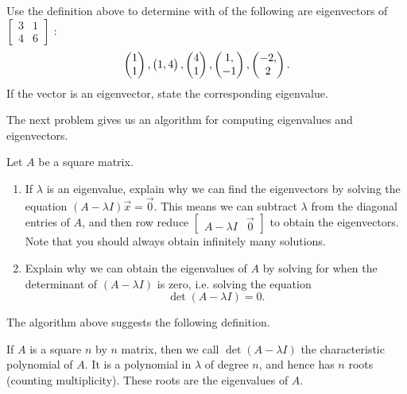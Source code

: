 \begin{problem}\label{use definition of eigenvectors}
Use the definition above to determine with of the following are eigenvectors of
$
\begin{bmatrix}
 3 & 1 \\
 4 & 6
\end{bmatrix}
$
:
$$\begin{pmatrix} 1\\1 \end{pmatrix}, \begin{pmatrix} 1,4 \end{pmatrix}, \begin{pmatrix} 4\\1 \end{pmatrix}, \begin{pmatrix} 1,\\-1 \end{pmatrix}, \begin{pmatrix} -2,\\2 \end{pmatrix}.$$   
If the vector is an eigenvector, state the corresponding eigenvalue.
\end{problem}


The next problem gives us an algorithm for computing eigenvalues and eigenvectors.
\begin{problem}
 Let $A$ be a square matrix.
\begin{enumerate}
 \item If $\lambda$ is an eigenvalue, explain why we can find the eigenvectors by solving the equation $(A-\lambda I)\vec x=\vec 0$.  This means we can subtract $\lambda$ from the diagonal entries of $A$, and then row reduce 
$\begin{bmatrix}A-\lambda I&\vec 0\end{bmatrix}$ 
to obtain the eigenvectors. Note that you should always obtain infinitely many solutions.
 \item Explain why we can obtain the eigenvalues of $A$ by solving for when the determinant of $(A-\lambda I)$ is zero, i.e. solving the equation $$\det (A-\lambda I)=0.$$  
\end{enumerate}
\end{problem}

The algorithm above suggests the following definition.
\begin{definition}
 If $A$ is a square $n$ by $n$ matrix, then we call $\det(A-\lambda I)$ the characteristic polynomial of $A$.  It is a polynomial in $\lambda$ of degree $n$, and hence has $n$ roots (counting multiplicity).  These roots are the eigenvalues of $A$.
\end{definition}

